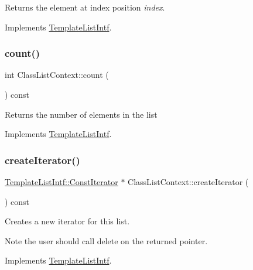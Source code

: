 Returns the element at index position {\itshape index}. 

Implements \mbox{\hyperlink{class_template_list_intf_aa51e57e72eacf4e8ce1055ee30a0f7f8}{Template\+List\+Intf}}.

\mbox{\label{class_class_list_context_ae97680a967f4f41b3eaa8bedbc42eddb}} 
\subsubsection{\texorpdfstring{count()}{count()}}
{\footnotesize\ttfamily int Class\+List\+Context\+::count (\begin{DoxyParamCaption}{ }\end{DoxyParamCaption}) const\hspace{0.3cm}{\ttfamily [virtual]}}

Returns the number of elements in the list 

Implements \mbox{\hyperlink{class_template_list_intf_a329e49e33484c2aa5106aac1bf4e5216}{Template\+List\+Intf}}.

\mbox{\label{class_class_list_context_acd2dd86b8a6463da6d360c87854cc512}} 
\subsubsection{\texorpdfstring{createIterator()}{createIterator()}}
{\footnotesize\ttfamily \mbox{\hyperlink{class_template_list_intf_1_1_const_iterator}{Template\+List\+Intf\+::\+Const\+Iterator}} $\ast$ Class\+List\+Context\+::create\+Iterator (\begin{DoxyParamCaption}{ }\end{DoxyParamCaption}) const\hspace{0.3cm}{\ttfamily [virtual]}}

Creates a new iterator for this list. \begin{DoxyNote}{Note}
the user should call delete on the returned pointer. 
\end{DoxyNote}


Implements \mbox{\hyperlink{class_template_list_intf_a56b82384db24c3e121076a1da046d378}{Template\+List\+Intf}}.

